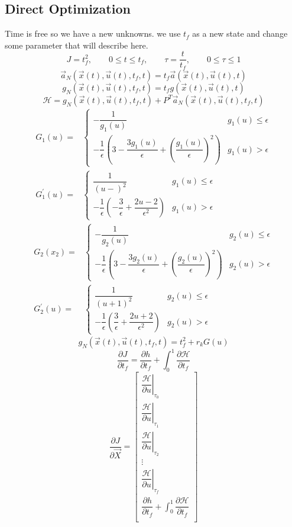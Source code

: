 \subsection{Direct Optimization}
Time is free so we have a new unknowns. we use $t_f$ as a new state and change some parameter that will describe here.
$$J = t_f^2, \qquad 0\leq t\leq t_f,\qquad \tau = \dfrac{t}{t_f}, \qquad 0\leq\tau\leq 1$$
$$
\vec{a}_N(\vec{x}(t),\vec{u}(t),t_f, t) = t_f\vec{a}(\vec{x}(t),\vec{u}(t), t)
$$
$$
g_N(\vec{x}(t),\vec{u}(t),t_f, t) = t_fg(\vec{x}(t),\vec{u}(t), t)
$$
$$
\mathcal{H} = g_N(\vec{x}(t),\vec{u}(t),t_f, t) + P^T\vec{a}_N(\vec{x}(t),\vec{u}(t),t_f, t) 
$$
\begin{align*}
	G_1(u) = &
	\begin{cases}
		-\dfrac{1}{g_1(u)}&  g_1(u) \leq \epsilon \\[1em]
		-\dfrac{1}{\epsilon}\left(3 - \dfrac{3g_1(u)}{\epsilon} + \left(\dfrac{g_1(u)}{\epsilon}\right)^2\right) &  g_1(u) > \epsilon
	\end{cases} \\
	G_1^\prime(u) = &
	\begin{cases}
		\dfrac{1}{(u - )^2}&  g_1(u) \leq \epsilon \\[1em]
		-\dfrac{1}{\epsilon}\left(-\dfrac{3}{\epsilon} + \dfrac{2u-2}{\epsilon^2} \right) &  g_1(u) > \epsilon
	\end{cases} 
\end{align*}
\begin{align*}
	G_2(x_2) = &
	\begin{cases}
		-\dfrac{1}{g_2(u)}&  g_2(u) \leq \epsilon \\[1em]
		-\dfrac{1}{\epsilon}\left(3 - \dfrac{3g_2(u)}{\epsilon} + \left(\dfrac{g_2(u)}{\epsilon}\right)^2\right) &  g_2(u) > \epsilon
	\end{cases} \\
	G_2^\prime(u) = &
	\begin{cases}
		\dfrac{1}{(u + 1)^2}&  g_2(u) \leq \epsilon \\[1em]
		-\dfrac{1}{\epsilon}\left(\dfrac{3}{\epsilon} + \dfrac{2u+2}{\epsilon^2} \right) &  g_2(u) > \epsilon
	\end{cases} 
\end{align*}
$$
g_N(\vec{x}(t),\vec{u}(t),t_f, t) = t_f^2 + r_kG(u)
$$
$$
\dfrac{\partial J}{\partial t_f} = \dfrac{\partial h}{\partial t_f} + \int_{0}^{1}
\dfrac{\partial \mathcal{H}}{\partial t_f}
$$
$$
\dfrac{\partial J}{\partial \vec{X}} = 
\begin{bmatrix}
	\left.\dfrac{\mathcal{H}}{\partial u}\right\vert_{\tau_0}\\
	\left.\dfrac{\mathcal{H}}{\partial u}\right\vert_{\tau_1}\\
	\left.\dfrac{\mathcal{H}}{\partial u}\right\vert_{\tau_2}\\
	\vdots\\
	\left.\dfrac{\mathcal{H}}{\partial u}\right\vert_{\tau_f}\\[20pt]
	\dfrac{\partial h}{\partial t_f} + \int_{0}^{1}
	\dfrac{\partial \mathcal{H}}{\partial t_f}\\
\end{bmatrix}
$$
